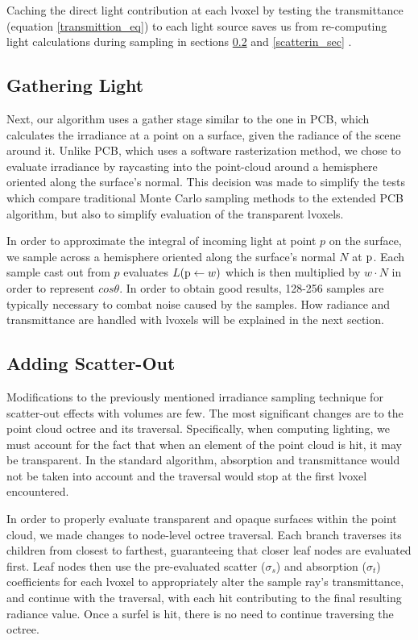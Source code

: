 \documentclass[runningheads]{llncs}
\begin{document}
Caching the direct light contribution at each lvoxel by testing the transmittance (equation \ref{transmittion_eq}) to each light source saves us from re-computing light calculations during sampling in sections \ref{scatterout_sec} and \ref{scatterin_sec} \cite{signotes:2010}.


\subsection{Gathering Light}
\label{gather_sec}

Next, our algorithm uses a gather stage similar to the one in PCB, which calculates the irradiance at a point on a surface, given the radiance of the scene around it.  Unlike PCB, which uses a software rasterization method, we chose to evaluate irradiance by raycasting into the point-cloud around a hemisphere oriented along the surface's normal.  This decision was made to simplify the tests which compare traditional Monte Carlo sampling methods to the extended PCB algorithm, but also to simplify evaluation of the transparent lvoxels.

In order to approximate the integral of incoming light at point $p$ on the surface, we sample across a hemisphere oriented along the surface's normal $N$ at $\textup{p}$.  Each sample cast out from $p$ evaluates $L(\textup{p} \leftarrow w)$ which is then multiplied by $w \cdot N$ in order to represent $cos\theta$.  In order to obtain good results, 128-256 samples are typically necessary to combat noise caused by the samples.  How radiance and transmittance are handled with lvoxels will be explained in the next section.


\subsection{Adding Scatter-Out}
\label{scatterout_sec}
Modifications to the previously mentioned irradiance sampling technique for scatter-out effects with volumes are few.  The most significant changes are to the point cloud octree and its traversal.  Specifically, when computing lighting, we must account for the fact that when an element of the point cloud is hit, it may be transparent.  In the standard algorithm, absorption and transmittance would not be taken into account and the traversal would stop at the first lvoxel encountered.

In order to properly evaluate transparent and opaque surfaces within the point cloud, we made changes to node-level octree traversal.  Each branch traverses its children from closest to farthest, guaranteeing that closer leaf nodes are evaluated first.  Leaf nodes then use the pre-evaluated scatter ($\sigma_{s}$) and absorption ($\sigma_{t}$) coefficients for each lvoxel to appropriately alter the sample ray's transmittance, and continue with the traversal, with each hit contributing to the final resulting radiance value.  Once a surfel is hit, there is no need to continue traversing the octree.
\end{document}
